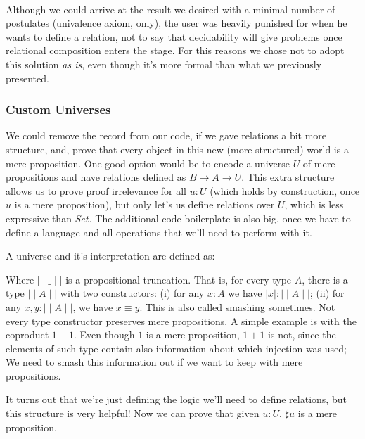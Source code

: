  \\
  
  Although we could arrive at the result we desired with a minimal number of postulates (univalence axiom, only), 
  the user was heavily punished for when he wants to define a relation, not to
  say that decidability will give problems once relational composition enters the stage. For this reasons
  we chose not to adopt this solution \emph{as is}, even though it's more formal than what we previously
  presented.

\subsubsection{Custom Universes}


  We could remove the  record from our code, if we gave relations a bit more structure,
  and, prove that every object in this new (more structured) world is a mere proposition.
  One good option would be to encode a universe $U$ of mere propositions and have relations
  defined as $B \rightarrow A \rightarrow U$. This extra structure allows us to prove proof irrelevance
  for all $u : U$ (which holds by construction, once $u$ is a mere proposition), but only let's us define
  relations over $U$, which is less expressive than $Set$. The additional code boilerplate is also big,
  once we have to define a language and all operations that we'll need to perform with it.
  
  A universe and it's interpretation are defined as:
  
  
  Where $\mid\mid\_\mid\mid$ is a propositional truncation. That is, for every type $A$,
  there is a type $\mid\mid A \mid\mid$ with two constructors: (i) for any $x : A$ we have
  $\mid x \mid : \mid\mid A \mid\mid$; (ii) for any $x , y : \mid\mid A \mid\mid$, we have
  $x \equiv y$. This is also called smashing sometimes. Not every type constructor 
  preserves mere propositions. A simple example is with the coproduct
  $1 + 1$. Even though $1$ is a mere proposition, $1 + 1$ is not, since the elements of such type
  contain also information about which injection was used; We need to smash this information out
  if we want to keep with mere propositions.
  
  It turns out that we're just defining the logic we'll need to define relations, but this
  structure is very helpful! Now we can prove that given $u : U$, $\sharp u$ is a mere proposition.
  
